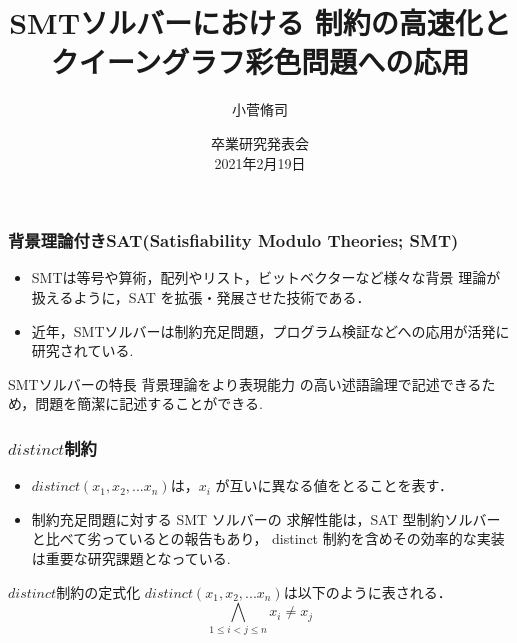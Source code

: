 \documentclass [dvipdfmx,12pt]{beamer}
\title[]{SMTソルバーにおける \distinct 制約の高速化とクイーングラフ彩色問題への応用}
\author{小菅脩司}
\institute{番原研究室}
\date{卒業研究発表会\\2021年2月19日}
\newcommand{\distinct}{$distinct$}
\begin{document}
\begin{frame} {}
    \titlepage
\end{frame}



\begin{frame}
    \frametitle{背景理論付きSAT(Satisfiability Modulo Theories; SMT)}
    \begin{itemize}
        \item SMTは等号や算術，配列やリスト，ビットベクターなど様々な背景 理論が扱えるように，SAT を拡張・発展させた技術である．
        \item 近年，SMTソルバーは制約充足問題，プログラム検証などへの応用が活発に研究されている.
    \end{itemize}
    \begin{alertblock}{SMTソルバーの特長}
        背景理論をより表現能力 の高い述語論理で記述できるため，問題を簡潔に記述することができる.
    \end{alertblock}
\end{frame}



\begin{frame}
    \frametitle{\distinct 制約}
    \begin{itemize}
        \item $distinct(x_1,x_2,...x_n)$は，$x_i$ が互いに異なる値をとることを表す．
        \item 制約充足問題に対する SMT ソルバーの 求解性能は，SAT 型制約ソルバーと比べて劣っているとの報告もあり， 
            distinct 制約を含めその効率的な実装は重要な研究課題となっている.
    \end{itemize}
    \begin{block}{\distinct 制約の定式化}
        $distinct(x_1,x_2,...x_n)$は以下のように表される．\\
        $$\bigwedge_{1 \leq i < j \leq n} x_i \neq x_j$$
    \end{block}
\end{frame}
\end{document}
